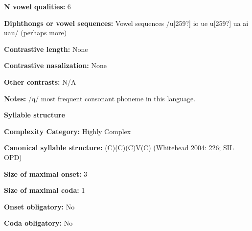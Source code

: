 \begin{styleBody}
\textbf{N vowel qualities:} 6
\end{styleBody}

\begin{styleBody}
\textbf{Diphthongs or vowel sequences:} Vowel sequences /u[259?] io ue u[259?] ua ai uau/ (perhaps more)
\end{styleBody}

\begin{styleBody}
\textbf{Contrastive length:} None
\end{styleBody}

\begin{styleBody}
\textbf{Contrastive nasalization:} None
\end{styleBody}

\begin{styleBody}
\textbf{Other contrasts:} N/A
\end{styleBody}

\begin{styleBody}
\textbf{Notes:} /q/ most frequent consonant phoneme in this language.
\end{styleBody}

\begin{styleBody}
\textbf{Syllable structure}
\end{styleBody}

\begin{styleBody}
\textbf{Complexity Category:} Highly Complex
\end{styleBody}

\begin{styleBody}
\textbf{Canonical syllable structure:} (C)(C)(C)V(C)\textbf{ }(Whitehead 2004: 226; SIL OPD)
\end{styleBody}

\begin{styleBody}
\textbf{Size of maximal onset:} 3
\end{styleBody}

\begin{styleBody}
\textbf{Size of maximal coda:} 1
\end{styleBody}

\begin{styleBody}
\textbf{Onset obligatory:} No
\end{styleBody}

\begin{styleBody}
\textbf{Coda obligatory:} No
\end{styleBody}

